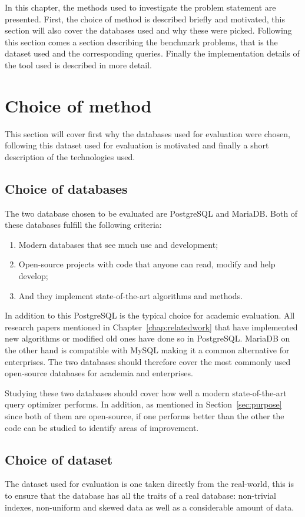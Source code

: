 In this chapter, the methods used to investigate the problem statement are
presented. First, the choice of method is described briefly and motivated, this
section will also cover the databases used and why these were picked. Following
this section comes a section describing the benchmark problems, that is the
dataset used and the corresponding queries. Finally the implementation details
of the tool used is described in more detail.

\section{Choice of method}\label{sec:choiceofmethod}
This section will cover first why the databases used for evaluation were
chosen, following this dataset used for evaluation is motivated and finally a
short description of the technologies used.

\subsection{Choice of databases}\label{sec:choiceofdatabases}
The two database chosen to be evaluated are PostgreSQL and MariaDB.
Both of these databases fulfill the following criteria:
\begin{enumerate}
\item Modern databases that see much use and development;
\item Open-source projects with code that anyone can read, modify and help develop;
\item And they implement state-of-the-art algorithms and methods.
\end{enumerate}

In addition to this PostgreSQL is the typical choice for academic evaluation.
All research papers mentioned in Chapter~\ref{chap:relatedwork} that have
implemented new algorithms or modified old ones have done so in PostgreSQL.
MariaDB on the other hand is compatible with MySQL making it a common
alternative for enterprises. The two databases should therefore cover the most
commonly used open-source databases for academia and enterprises.

Studying these two databases should cover how well a modern state-of-the-art
query optimizer performs. In addition, as mentioned in Section~\ref{sec:purpose}
since both of them are open-source, if one performs better than the other the
code can be studied to identify areas of improvement.

\subsection{Choice of dataset}
The dataset used for evaluation is one taken directly from the real-world, this
is to ensure that the database has all the traits of a real database:
non-trivial indexes, non-uniform and skewed data as well as a considerable
amount of data.


